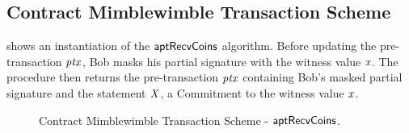 \subsection{Contract Mimblewimble Transaction Scheme}

 shows an instantiation of the $\mathsf{aptRecvCoins}$ algorithm.
Before updating the pre-transaction $\mathit{ptx}$, Bob masks his partial signature with the witness value $\mathit{x}$.
The procedure then returns the pre-transaction $\mathit{ptx}$ containing Bob's masked partial signature and the statement $\mathit{X}$, a Commitment to the witness value $\mathit{x}$.

\begin{figure}
    \begin{center}
    \end{center}
    \caption{Contract Mimblewimble Transaction Scheme - $\mathsf{aptRecvCoins}$. \label{fig:inst-apt-mw-tx-recv}}
\end{figure}

